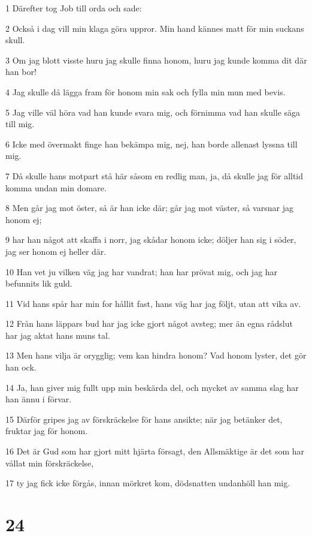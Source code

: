 \par 1 Därefter tog Job till orda och sade:
\par 2 Också i dag vill min klaga göra uppror. Min hand kännes matt för min suckans skull.
\par 3 Om jag blott visste huru jag skulle finna honom, huru jag kunde komma dit där han bor!
\par 4 Jag skulle då lägga fram för honom min sak och fylla min mun med bevis.
\par 5 Jag ville väl höra vad han kunde svara mig, och förnimma vad han skulle säga till mig.
\par 6 Icke med övermakt finge han bekämpa mig, nej, han borde allenast lyssna till mig.
\par 7 Då skulle hans motpart stå här såsom en redlig man, ja, då skulle jag för alltid komma undan min domare.
\par 8 Men går jag mot öster, så är han icke där; går jag mot väster, så varsnar jag honom ej;
\par 9 har han något att skaffa i norr, jag skådar honom icke; döljer han sig i söder, jag ser honom ej heller där.
\par 10 Han vet ju vilken väg jag har vandrat; han har prövat mig, och jag har befunnits lik guld.
\par 11 Vid hans spår har min for hållit fast, hans väg har jag följt, utan att vika av.
\par 12 Från hans läppars bud har jag icke gjort något avsteg; mer än egna rådslut har jag aktat hans muns tal.
\par 13 Men hans vilja är orygglig; vem kan hindra honom? Vad honom lyster, det gör han ock.
\par 14 Ja, han giver mig fullt upp min beskärda del, och mycket av samma slag har han ännu i förvar.
\par 15 Därför gripes jag av förskräckelse för hans ansikte; när jag betänker det, fruktar jag för honom.
\par 16 Det är Gud som har gjort mitt hjärta försagt, den Allsmäktige är det som har vållat min förskräckelse,
\par 17 ty jag fick icke förgås, innan mörkret kom, dödsnatten undanhöll han mig.

\chapter{24}

